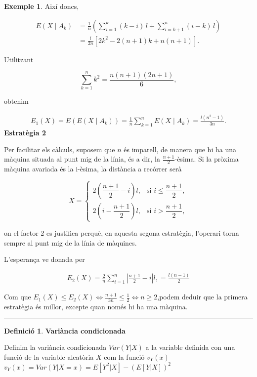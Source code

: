 \documentclass[
  catalan,
]{article}
\theoremstyle{definition}
\newtheorem{definition}{Definició}[section]
\theoremstyle{definition}
\newtheorem{example}{Exemple}[section]
\theoremstyle{definition}
\theoremstyle{definition}
\theoremstyle{remark}
\begin{document}
\begin{example}
Així doncs,

\[
\begin{aligned}
E(X\mid A_k)
&= \frac{1}{n} \left( \sum_{i=1}^{k}(k-i)\,l + \sum_{i=k+1}^{n}(i-k)\,l\right)\\
&= \frac{l}{2n} \left[ 2k^2-2(n+1)k+n(n+1) \right].
\end{aligned}
\]

Utilitzant

\[
\sum_{k=1}^{n}k^2 = \frac{n(n+1)(2n+1)}{6},
\]

obtenim

\[
\begin{aligned}
E_1(X)=
E\!\left(E(X\mid A_k)\right)=\frac{1}{n} \sum_{k=1}^{n} E(X\mid A_k)= \frac{l(n^2-1)}{3n}.
\end{aligned}
\]
\textbf{Estratègia 2}

Per facilitar els càlculs, suposem que \(n\) és imparell, de manera que hi ha una màquina situada al punt mig de la línia, és a dir, la \(\frac{n+1}{2}\)-èsima. Si la pròxima màquina avariada és la i-èsima, la distància a recórrer serà

\[
X=
\begin{cases}
2\left(\dfrac{n+1}{2}-i\right)l, & \text{si } i\le\dfrac{n+1}{2},\\ 
2\left(i-\dfrac{n+1}{2}\right)l, & \text{si } i>\dfrac{n+1}{2},
\end{cases}
\]

on el factor 2 es justifica perquè, en aquesta segona estratègia, l'operari torna sempre al punt mig de la línia de màquines.

L'esperança ve donada per

\[
\begin{aligned}
E_2(X)=\frac{2}{n}\sum_{i=1}^{n}\left|\frac{n+1}{2}-i\right|l,=\frac{l(n-1)}{2}
\end{aligned}
\]

Com que \(E_1(X)\le E_2(X) \iff \frac{n+1}{3n}\le\frac{1}{2}  \iff n\ge 2\),podem deduir que la primera estratègia és millor, excepte quan només hi ha una màquina.
\end{example}

\begin{center}\rule{0.5\linewidth}{0.5pt}\end{center}

\begin{definition}
\textbf{Variància condicionada}

Definim la variància condicionada \(Var(Y|X)\) a la variable definida con una funció de la variable aleatòria \(X\) com la funció \(v_Y(x)\)\\
\(v_Y(x)= Var(Y|X=x)=E[Y^2|X]-(E[Y|X])^2\)
\end{definition}
\end{document}

